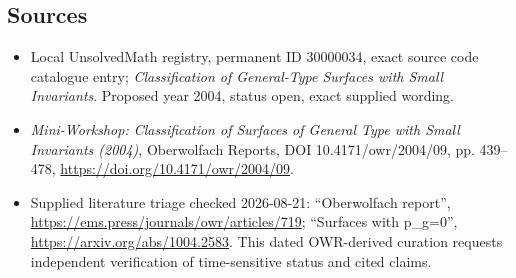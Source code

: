 \documentclass[11pt]{article}
\begin{document}
\subsection{Sources}
\begin{itemize}
\item Local UnsolvedMath registry, permanent ID 30000034, exact source code catalogue entry; \emph{Classification of General-Type Surfaces with Small Invariants}. Proposed year 2004, status open, exact supplied wording.
\item \emph{Mini-Workshop: Classification of Surfaces of General Type with Small Invariants (2004)}, Oberwolfach Reports, DOI 10.4171/owr/2004/09, pp. 439--478, \url{https://doi.org/10.4171/owr/2004/09}.
\item Supplied literature triage checked 2026-08-21: ``Oberwolfach report'', \url{https://ems.press/journals/owr/articles/719}; ``Surfaces with p\_g=0'', \url{https://arxiv.org/abs/1004.2583}. This dated OWR-derived curation requests independent verification of time-sensitive status and cited claims.
\end{itemize}
\end{document}
